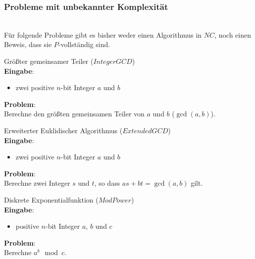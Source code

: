 \subsubsection{Probleme mit unbekannter Komplexität} \hfill \\
Für folgende Probleme gibt es bisher weder einen Algorithmus in $NC$,
noch einen Beweis, dass sie $P$-vollständig sind.

\begin{problem}
    Größter gemeinsamer Teiler ($IntegerGCD$) \\
    \textbf{Eingabe}:
    \begin{itemize}
        \item zwei positive $n$-bit Integer $a$ und $b$
    \end{itemize}
    \textbf{Problem}: \\
    Berechne den größten gemeinsamen Teiler von $a$ und $b$ ($\gcd(a,b)$).
    \cite[S.229]{greenlaw}
\end{problem}

\begin{problem}
    Erweiterter Euklidischer Algorithmus ($ExtendedGCD$) \\
    \textbf{Eingabe}:
    \begin{itemize}
        \item zwei positive $n$-bit Integer $a$ und $b$
    \end{itemize}
    \textbf{Problem}: \\
    Berechne zwei Integer $s$ und $t$, so dass $as + bt = \gcd(a,b)$ gilt.
    \cite[S.229]{greenlaw}
\end{problem}

\begin{problem}
    Diskrete Exponentialfunktion ($ModPower$) \\
    \textbf{Eingabe}:
    \begin{itemize}
        \item positive $n$-bit Integer $a$, $b$ und $c$
    \end{itemize}
    \textbf{Problem}: \\
    Berechne $a^b \mod c$.
    \cite[S.231]{greenlaw}
\end{problem}

